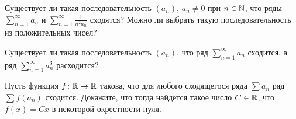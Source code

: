 \documentclass[a4paper,11pt]{article}
\begin{document}
Существует ли такая последовательность $(a_n)$, $a_n\ne0$ при $n\in\mathbb{N}$,
что ряды $\sum\limits_{n=1}^\infty a_n$ и
$\sum\limits_{n=1}^\infty \frac1{n^2a_n}$ сходятся?
Можно ли выбрать такую последовательность из
положительных чисел?


Существует ли такая последовательность $(a_n)$, что
ряд $\sum\limits_{n=1}^\infty a_n$ сходится, а ряд
$\sum\limits_{n=1}^\infty a_n^3$ расходится?




Пусть функция $f\colon\mathbb{R}\rightarrow\mathbb{R}$ такова, что для любого сходящегося
ряда $\sum a_n$ ряд $\sum f(a_n)$ сходится. Докажите, что тогда найдётся
такое число $C\in\mathbb{R}$, что $f(x)=Cx$ в некоторой окрестности нуля.

\end{document}
